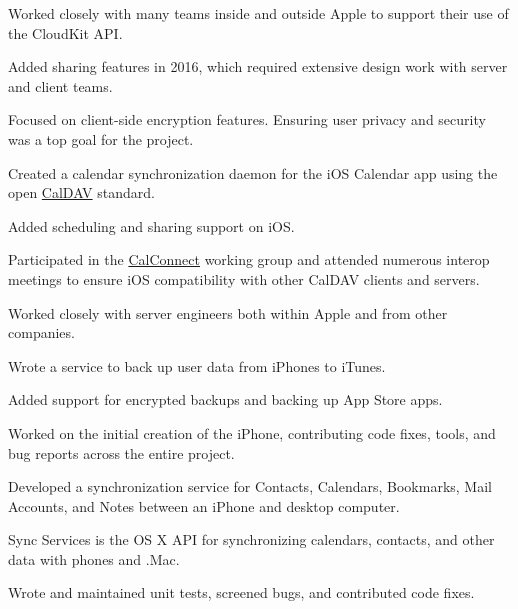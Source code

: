\begin{cventries}
{\begin{cvsubentries}
{\begin{cvitems}
         		\item {Worked closely with many teams inside and outside Apple to support their use of the CloudKit API.}
         		\item {Added sharing features in 2016, which required extensive design work with server and client teams.}
			\item {Focused on client-side encryption features. Ensuring user privacy and security was a top goal for the project.}
         	 \end{cvitems}
        		}
       		{}%
		{
		\begin{cvitems}
         		\item {Created a calendar synchronization daemon for the iOS Calendar app using the open \href{https://tools.ietf.org/html/rfc4791}{CalDAV} standard.}
			\item {Added scheduling and sharing support on iOS.} 
         		\item {Participated in the \href{https://www.calconnect.org}{CalConnect} working group and attended numerous interop meetings to ensure iOS compatibility with other CalDAV clients and servers.}
			\item {Worked closely with server engineers both within Apple and from other companies.}
         	 \end{cvitems}
        		}
       		{}
		{
		\begin{cvitems}
         		\item {Wrote a service to back up user data from iPhones to iTunes.}
			\item {Added support for encrypted backups and backing up App Store apps.}
         	 \end{cvitems}
        		}
       		{}
		{
		\begin{cvitems}
			\item {Worked on the initial creation of the iPhone, contributing code fixes, tools, and bug reports across the entire project.}
         		\item {Developed a synchronization service for Contacts, Calendars, Bookmarks, Mail Accounts, and Notes between an iPhone and desktop computer.}
         	 \end{cvitems}
        		}
       		{Sync Services is the OS X API for synchronizing calendars, contacts, and other data with phones and .Mac.}
		{
		\begin{cvitems}
         		\item {Wrote and maintained unit tests, screened bugs, and contributed code fixes.}
         	 \end{cvitems}
        		}
      	\end{cvsubentries}
    }
\end{cventries}